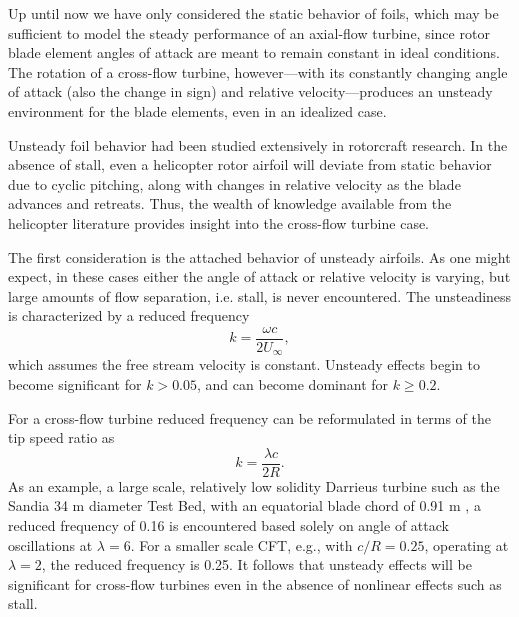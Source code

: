 Up until now we have only considered the static behavior of foils, which may be
sufficient to model the steady performance of an axial-flow turbine, since rotor
blade element angles of attack are meant to remain constant in ideal conditions.
The rotation of a cross-flow turbine, however---with its constantly changing
angle of attack (also the change in sign) and relative velocity---produces an
unsteady environment for the blade elements, even in an idealized case.

Unsteady foil behavior had been studied extensively in rotorcraft research. In
the absence of stall, even a helicopter rotor airfoil will deviate from static
behavior due to cyclic pitching, along with changes in relative velocity as the
blade advances and retreats. Thus, the wealth of knowledge available from the
helicopter literature provides insight into the cross-flow turbine case.

The first consideration is the attached behavior of unsteady airfoils. As one
might expect, in these cases either the angle of attack or relative velocity is
varying, but large amounts of flow separation, i.e. stall, is never encountered.
The unsteadiness is characterized by a reduced frequency~\cite{Leishman2006}
\begin{equation}
    k = \frac{\omega c}{2 U_\infty},
\end{equation}
which assumes the free stream velocity is constant. Unsteady effects begin to
become significant for $k > 0.05$, and can become dominant for $k \ge 0.2$.

For a cross-flow turbine reduced frequency can be reformulated in terms of the
tip speed ratio as
\begin{equation}
    k = \frac{\lambda c}{2R}.
\end{equation}
As an example, a large scale, relatively low solidity Darrieus turbine such as
the Sandia 34 m diameter Test Bed, with an equatorial blade chord of 0.91 m
\cite{Murray2011}, a reduced frequency of 0.16 is encountered based solely on
angle of attack oscillations at $\lambda=6$. For a smaller scale CFT, e.g., with
$c/R = 0.25$, operating at $\lambda = 2$, the reduced frequency is 0.25. It
follows that unsteady effects will be significant for cross-flow turbines even
in the absence of nonlinear effects such as stall.

